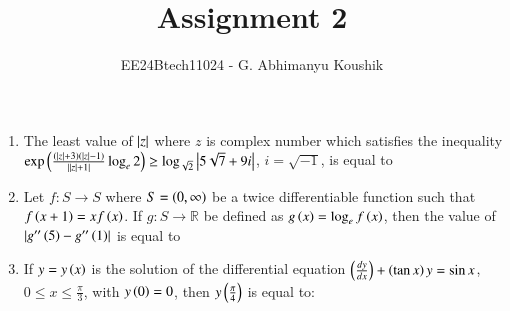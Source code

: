 \documentclass[journal,12pt,onecolumn]{IEEEtran}
\theoremstyle{remark}
\begin{document}
\title{Assignment 2}
\author{EE24Btech11024 - G. Abhimanyu Koushik}
\maketitle
\renewcommand{\thefigure}{\theenumi}
\renewcommand{\thetable}{\theenumi}
\begin{enumerate}

\item The least value of $\left\vert z\right\vert$ where $z$ is complex number which satisfies the inequality $\exp\left(\frac{\left(\left\vert z\right\vert+3\right)\left(\left\vert z\right\vert-1\right)}{\left\vert{\left\vert z\right\vert+1}\right\vert}\log_e{2}\right)\ge\log_{\sqrt{2}}{\left\vert5\sqrt{7}+9i\right\vert}$, $i=\sqrt{-1}$, is equal to

\hfill{}
\begin{enumerate}
\end{enumerate}

\item Let $f:S\rightarrow S$ where $S=\left(0,\infty\right)$ be a twice differentiable function such that $f\left(x+1\right)=xf\left(x\right)$. If $g:S\rightarrow \mathbb{R}$ be defined as $g\left(x\right) = \log_e{f\left(x\right)}$, then the value of $\left\vert g''\left(5\right)-g''\left(1\right)\right\vert$ is equal to 

\hfill{}
\begin{enumerate}
\end{enumerate}

\item If $y=y\left(x\right)$ is the solution of the differential equation $\left(\frac{dy}{dx}\right)+\left(\tan x\right)y=\sin x$, $0\leq x\leq \frac{\pi}{3}$, with $y\left(0\right)=0$, then $y\left(\frac{\pi}{4}\right)$ is equal to:
\hfill{}
\begin{enumerate}
\end{enumerate}


\end{enumerate}
\end{document}
